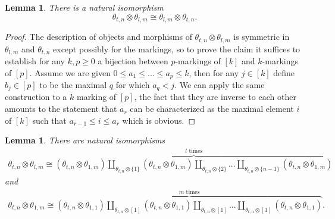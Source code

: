 \documentclass[a4paper, reqno]{amsart}
\newtheorem{lemma}[theorem]{Lemma}
\theoremstyle{definition}
\begin{document}
\begin{lemma}\label{lem:lax_1}
There is a natural isomorphism
\[\theta_{t,n}\otimes\theta_{l,m}\cong\theta_{l,m}\otimes\theta_{t,n}.\]
\end{lemma}
\begin{proof}
The description of objects and morphisms of $\theta_{t,n}\otimes\theta_{l,m}$ is symmetric in $\theta_{l,m}$ and $\theta_{t,n}$ except possibly for the markings, so to prove the claim it suffices to establish for any $k,p\geq0$ a bijection between $p$-markings of $[k]$ and $k$-markings of $[p]$. Assume we are given $0\leq a_1\leq...\leq a_p\leq k$, then for any $j\in[k]$ define $b_j\in[p]$ to be the maximal $q$ for which $a_q<j$. We can apply the same construction to a $k$ marking of $[p]$, the fact that they are inverse to each other amounts to the statement that $a_r$ can be characterized as the maximal element $i$ of $[k]$ such that $a_{r-1}\leq i\leq a_r$ which is obvious.
\end{proof}
\begin{lemma}\label{lem:lax_2}
There are natural isomorphisms
\begin{align}\label{eq:colim_one}
    \theta_{t,n}\otimes\theta_{l,m}\cong\overbrace{(\theta_{t,n}\otimes\theta_{1,m})\coprod_{\theta_{t,n}\otimes\{1\}}(\theta_{t,n}\otimes\theta_{1,m})\coprod_{\theta_{t,n}\otimes\{2\}}...\coprod_{\theta_{t,n}\otimes\{n-1\}}(\theta_{t,n}\otimes\theta_{1,m})}^\text{$l$ times}
\end{align}
 and 
 \begin{align}\label{eq:colim_two}
     \theta_{t,n}\otimes\theta_{1,m}\cong\overbrace{(\theta_{t,n}\otimes\theta_{1,1})\coprod_{\theta_{t,n}\otimes[1]}(\theta_{t,n}\otimes\theta_{1,1})\coprod_{\theta_{t,n}\otimes[1]}...\coprod_{\theta_{t,n}\otimes[1]}(\theta_{t,n}\otimes\theta_{1,1})}^\text{$m$ times}.
 \end{align}
 \[\]
\end{lemma}
\end{document}
